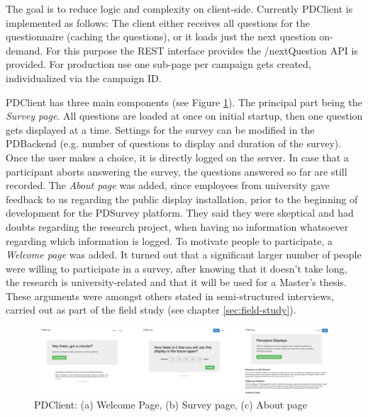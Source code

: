 		The goal is to reduce logic and complexity on client-side. Currently PDClient is implemented as follows: The client either receives all questions for the questionnaire (caching the questions), or it loads just the next question on-demand. For this purpose the REST interface provides the /nextQuestion API is provided. For production use one sub-page per campaign gets created, individualized via the campaign ID.
		

		PDClient has three main components (see Figure \ref{fig:4-pdclient-screenshots}). The principal part being the \textit{Survey page}. All questions are loaded at once on initial startup, then one question gets displayed at a time. Settings for the survey can be modified in the PDBackend (e.g. number of questions to display and duration of the survey). Once the user makes a choice, it is directly logged on the server. In case that a participant aborts answering the survey, the questions answered so far are still recorded. The \textit{About page} was added, since employees from university gave feedback to us regarding the public display installation, prior to the beginning of development for the PDSurvey platform. They said they were skeptical and had doubts regarding the research project, when having no information whatsoever regarding which information is logged. To motivate people to participate, a \textit{Welcome page} was added. It turned out that a significant larger number of people were willing to participate in a survey, after knowing that it doesn't take long, the research is university-related and that it will be used for a Master's thesis. These arguments were amongst others stated in semi-structured interviews, carried out as part of the field study (see chapter \ref{sec:field-study}).


		\begin{figure}%
		    \begin{center}
		        \includegraphics[width=\columnwidth]{img/screenshots/pdclient-overview}
		    \end{center}
			\caption[Overview of PDClient]{PDClient: (a) Welcome Page, (b) Survey page, (c) About page}
		 \label{fig:4-pdclient-screenshots}
		\end{figure}




